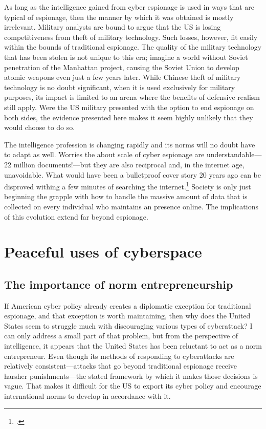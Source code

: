 \documentclass[11pt]{memoir}
\begin{document}
As long as the intelligence gained from cyber espionage is used in ways that are typical of espionage, then the manner by which it was obtained is mostly irrelevant. Military analysts are bound to argue that the US is losing competitiveness from theft of military technology. Such losses, however, fit easily within the bounds of traditional espionage. The quality of the military technology that has been stolen is not unique to this era; imagine a world without Soviet penetration of the Manhattan project, causing the Soviet Union to develop atomic weapons even just a few years later. While Chinese theft of military technology is no doubt significant, when it is used exclusively for military purposes, its impact is limited to an arena where the benefits of defensive realism still apply. Were the US military presented with the option to end espionage on both sides, the evidence presented here makes it seem highly unlikely that they would choose to do so.

The intelligence profession is changing rapidly and its norms will no doubt have to adapt as well. Worries the about scale of cyber espionage are understandable---22 million documents!---but they are also reciprocal and, in the internet age, unavoidable. What would have been a bulletproof cover story 20 years ago can be disproved withing a few minutes of searching the internet.\footcite{lucas_spycraft_2019} Society is only just beginning the grapple with how to handle the massive amount of data that is collected on every individual who maintains an presence online. The implications of this evolution extend far beyond espionage.

\section{Peaceful uses of cyberspace}
\subsection{The importance of norm entrepreneurship}
If American cyber policy already creates a diplomatic exception for traditional espionage, and that exception is worth maintaining, then why does the United States seem to struggle much with discouraging various types of cyberattack? I can only address a small part of that problem, but from the perspective of intelligence, it appears that the United States has been reluctant to act as a norm entrepreneur. Even though its methods of responding to cyberattacks are relatively consistent---attacks that go beyond traditional espionage receive harsher punishments---the stated framework by which it makes those decisions is vague. That makes it difficult for the US to export its cyber policy and encourage international norms to develop in accordance with it.
\end{document}
